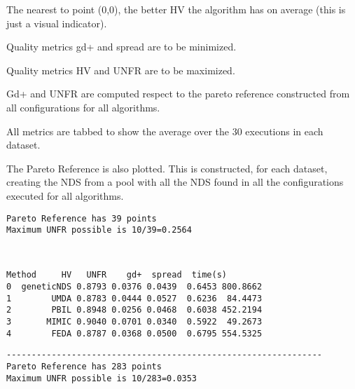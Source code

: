 \documentclass[11pt]{article}
\begin{document}
The nearest to point (0,0), the better HV the algorithm has on average
(this is just a visual indicator).

Quality metrics gd+ and spread are to be minimized.

Quality metrics HV and UNFR are to be maximized.

Gd+ and UNFR are computed respect to the pareto reference constructed
from all configurations for all algorithms.

All metrics are tabbed to show the average over the 30 executions in
each dataset.

The Pareto Reference is also plotted. This is constructed, for each
dataset, creating the NDS from a pool with all the NDS found in all the
configurations executed for all algorithms.

    \begin{Verbatim}[commandchars=\\\{\}]
Pareto Reference has 39 points
Maximum UNFR possible is 10/39=0.2564
    \end{Verbatim}

    \begin{center}
    \end{center}
    { \hspace*{\fill} \\}
    
    
    \begin{Verbatim}[commandchars=\\\{\}]
       Method     HV   UNFR    gd+  spread  time(s)
0  geneticNDS 0.8793 0.0376 0.0439  0.6453 800.8662
1        UMDA 0.8783 0.0444 0.0527  0.6236  84.4473
2        PBIL 0.8948 0.0256 0.0468  0.6038 452.2194
3       MIMIC 0.9040 0.0701 0.0340  0.5922  49.2673
4        FEDA 0.8787 0.0368 0.0500  0.6795 554.5325
    \end{Verbatim}

    
    \begin{Verbatim}[commandchars=\\\{\}]
---------------------------------------------------------------
Pareto Reference has 283 points
Maximum UNFR possible is 10/283=0.0353
    \end{Verbatim}

    \begin{center}
    \end{center}
    { \hspace*{\fill} \\}
    
\end{document}
